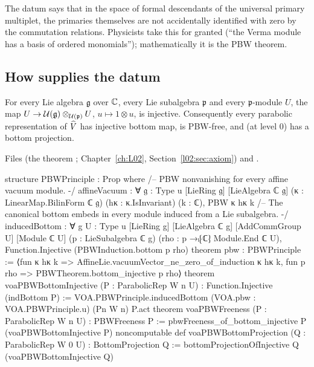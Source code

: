 \begin{physics}
The datum says that in the space of formal descendants of the universal primary multiplet, the primaries themselves are
not accidentally identified with zero by the commutation relations. Physicists take this for granted (``the Verma module
has a basis of ordered monomials''); mathematically it is the PBW theorem.
\end{physics}

\subsection{How \texorpdfstring{}{VOA.pbw} supplies the datum}

\begin{theorem}\label{l13:thm:voapbw}
For every Lie algebra $\mathfrak g$ over ${\mathbb{C}}$, every Lie subalgebra $\mathfrak p$ and every $\mathfrak p$-module $U$, the map
$U\to\mathcal{U}(\mathfrak g)\otimes_{\mathcal{U}(\mathfrak p)}U$, $u\mapsto1\otimes u$, is injective. Consequently every
parabolic representation of $\widehat{V}$ has injective bottom map, is PBW-free, and (at level $0$) has a bottom projection.
\end{theorem}
\noindent Files  (the theorem ; Chapter~\ref{ch:L02},
Section~\ref{l02:sec:axiom}) and .
\begin{leancode}
structure PBWPrinciple : Prop where
  /-- PBW nonvanishing for every affine vacuum module. -/
  affineVacuum : ∀ {𝔤 : Type u} [LieRing 𝔤] [LieAlgebra ℂ 𝔤]
      (κ : LinearMap.BilinForm ℂ 𝔤) (hκ : κ.IsInvariant) (k : ℂ),
    PBW κ hκ k
  /-- The canonical bottom embeds in every module induced from a Lie subalgebra. -/
  inducedBottom : ∀ {g U : Type u} [LieRing g] [LieAlgebra ℂ g]
      [AddCommGroup U] [Module ℂ U] (p : LieSubalgebra ℂ g)
      (rho : p →ₗ⁅ℂ⁆ Module.End ℂ U),
    Function.Injective (PBWInduction.bottom p rho)
theorem pbw : PBWPrinciple :=
  ⟨fun κ hκ k => AffineLie.vacuumVector_ne_zero_of_induction κ hκ k,
    fun p rho => PBWTheorem.bottom_injective p rho⟩
theorem voaPBWBottomInjective (P : ParabolicRep W n U) :
    Function.Injective (indBottom P) :=
  VOA.PBWPrinciple.inducedBottom
    (VOA.pbw : VOA.PBWPrinciple.{u}) (Pn W n) P.act
theorem voaPBWFreeness (P : ParabolicRep W n U) : PBWFreeness P :=
  pbwFreeness_of_bottom_injective P (voaPBWBottomInjective P)
noncomputable def voaPBWBottomProjection (Q : ParabolicRep W 0 U) : BottomProjection Q :=
  bottomProjectionOfInjective Q (voaPBWBottomInjective Q)
\end{leancode}

